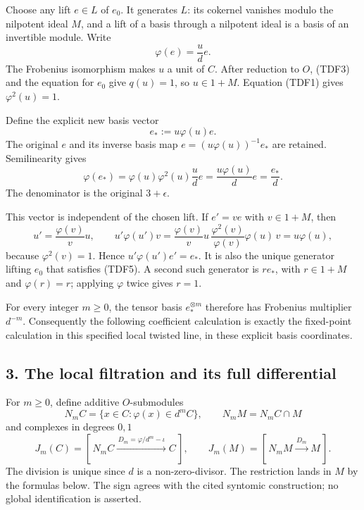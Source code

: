 \documentclass[
  10pt,
]{article}
\begin{document}
Choose any lift \(e\in L\) of \(e_0\). It generates \(L\): its cokernel
vanishes modulo the nilpotent ideal \(M\), and a lift of a basis through
a nilpotent ideal is a basis of an invertible module. Write \[
 \varphi(e)=\frac{u}{d}e.
 \tag{TDF3}
\] The Frobenius isomorphism makes \(u\) a unit of \(C\). After
reduction to \(O\), (TDF3) and the equation for \(e_0\) give \(q(u)=1\),
so \(u\in1+M\). Equation (TDF1) gives \(\varphi^2(u)=1\).

Define the explicit new basis vector \[
 e_*:=u\varphi(u)e.
 \tag{TDF4}
\] The original \(e\) and its inverse basis map
\(e=(u\varphi(u))^{-1}e_*\) are retained. Semilinearity gives \[
 \varphi(e_*)
 =\varphi(u)\varphi^2(u)\frac{u}{d}e
 =\frac{u\varphi(u)}d e
 =\frac{e_*}{d}.
 \tag{TDF5}
\] The denominator is the original \(3+\epsilon\).

This vector is independent of the chosen lift. If \(e'=v e\) with
\(v\in1+M\), then \[
 u'=\frac{\varphi(v)}v u,\qquad
 u'\varphi(u')v
 =\frac{\varphi(v)}v u\,
   \frac{\varphi^2(v)}{\varphi(v)}\varphi(u)\,v
 =u\varphi(u),
\] because \(\varphi^2(v)=1\). Hence \(u'\varphi(u')e'=e_*\). It is also
the unique generator lifting \(e_0\) that satisfies (TDF5). A second
such generator is \(r e_*\), with \(r\in1+M\) and \(\varphi(r)=r\);
applying \(\varphi\) twice gives \(r=1\).

For every integer \(m\geq0\), the tensor basis \(e_*^{\otimes m}\)
therefore has Frobenius multiplier \(d^{-m}\). Consequently the
following coefficient calculation is exactly the fixed-point calculation
in this specified local twisted line, in these explicit basis
coordinates.

\subsection{3. The local filtration and its full
differential}\label{the-local-filtration-and-its-full-differential}

For \(m\geq0\), define additive \(O\)-submodules \[
 N_mC=\{x\in C:\varphi(x)\in d^mC\},\qquad
 N_mM=N_mC\cap M
\] and complexes in degrees \(0,1\) \[
 J_m(C)=
 [\,N_mC\xrightarrow{\,D_m=\varphi/d^m-\iota\,}C\,],
 \qquad
 J_m(M)=
 [\,N_mM\xrightarrow{\,D_m\,}M\,].
 \tag{TDF6}
\] The division is unique since \(d\) is a non-zero-divisor. The
restriction lands in \(M\) by the formulas below. The sign agrees with
the cited syntomic construction; no global identification is asserted.
\end{document}
